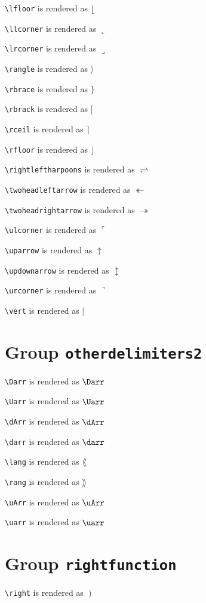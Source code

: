 \texttt{\textbackslash lfloor} is rendered as $\lfloor$

\texttt{\textbackslash llcorner} is rendered as $\llcorner$

\texttt{\textbackslash lrcorner} is rendered as $\lrcorner$

\texttt{\textbackslash rangle} is rendered as $\rangle$

\texttt{\textbackslash rbrace} is rendered as $\rbrace$

\texttt{\textbackslash rbrack} is rendered as $\rbrack$

\texttt{\textbackslash rceil} is rendered as $\rceil$

\texttt{\textbackslash rfloor} is rendered as $\rfloor$

\texttt{\textbackslash rightleftharpoons} is rendered as $\rightleftharpoons$

\texttt{\textbackslash twoheadleftarrow} is rendered as $\twoheadleftarrow$

\texttt{\textbackslash twoheadrightarrow} is rendered as $\twoheadrightarrow$

\texttt{\textbackslash ulcorner} is rendered as $\ulcorner$

\texttt{\textbackslash uparrow} is rendered as $\uparrow$

\texttt{\textbackslash updownarrow} is rendered as $\updownarrow$

\texttt{\textbackslash urcorner} is rendered as $\urcorner$

\texttt{\textbackslash vert} is rendered as $\vert$

\section{ Group \texttt{other\textunderscore delimiters2}}

\texttt{\textbackslash Darr} is rendered as $\Darr$

\texttt{\textbackslash Uarr} is rendered as $\Uarr$

\texttt{\textbackslash dArr} is rendered as $\dArr$

\texttt{\textbackslash darr} is rendered as $\darr$

\texttt{\textbackslash lang} is rendered as $\lang$

\texttt{\textbackslash rang} is rendered as $\rang$

\texttt{\textbackslash uArr} is rendered as $\uArr$

\texttt{\textbackslash uarr} is rendered as $\uarr$

\section{ Group \texttt{right\textunderscore function}}

\texttt{\textbackslash right} is rendered as $\left. \right)$